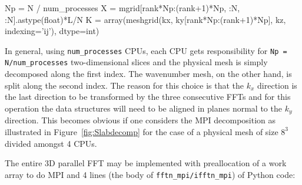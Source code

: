 \documentclass[11pt, oneside]{article}
\newcommand{\inpyth}{\lstinline[keywordstyle={}, basicstyle=\ttfamily]} %[]%
\begin{document}
\begin{python}
Np = N / num_processes
X = mgrid[rank*Np:(rank+1)*Np, :N, :N].astype(float)*L/N
K = array(meshgrid(kx, ky[rank*Np:(rank+1)*Np], kz,
                   indexing='ij'), dtype=int)
\end{python}
In general, using \inpyth{num_processes} CPUs, each CPU gets responsibility for \inpyth{Np = N/num_processes} two-dimensional slices and the physical mesh is simply decomposed along the first index. The wavenumber mesh, on the other hand, is split along the second index. The reason for this choice is that the $k_x$ direction is the last direction to be transformed by the three consecutive FFTs and for this operation the data structures will need to be aligned in planes normal to the $k_y$ direction. This becomes obvious if one considers the MPI decomposition as illustrated in Figure~\ref{fig:Slabdecomp} for the case of a physical mesh of size $8^3$ divided amongst 4 CPUs.

The entire 3D parallel FFT may be implemented with preallocation of a work array to do MPI and 4 lines (the body of \inpyth{fftn_mpi/ifftn_mpi}) of Python code:
\end{document}
